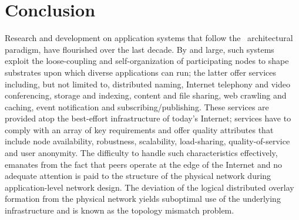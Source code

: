 \section{Conclusion}
\label{section:conclusion}

Research and development on application systems that follow the 
\p\ architectural paradigm, have flourished over the last decade.
By and large, such systems exploit the loose-coupling and self-organization 
of participating nodes to shape substrates upon which diverse applications 
can run; the latter offer services including, but not limited to, 
distributed naming, 
Internet telephony and video conferencing, 
storage and indexing, 
content and file sharing, 
web crawling and caching, 
event notification and subscribing/publishing.
These services are provided atop the 
best-effort infrastructure of today's Internet;
services have to comply with an array of key requirements and 
offer quality attributes that include node availability, robustness,
scalability, load-sharing, quality-of-service and user anonymity. 
The difficulty to handle such characteristics effectively, 
emanates from the fact that
peers  operate at the edge of the Internet and no 
adequate attention is paid to the structure of the physical network 
during application-level network design. 
The deviation of the logical distributed overlay formation from the 
physical network yields suboptimal use of the underlying 
infrastructure and is known as the topology mismatch
problem.

